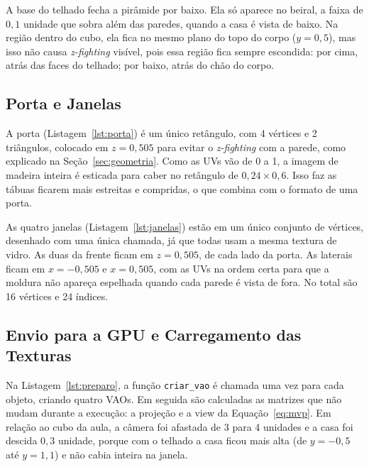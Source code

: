 \documentclass{article}
\begin{document}
A base do telhado fecha a pirâmide por baixo. Ela só aparece no beiral, a faixa de $0{,}1$ unidade que sobra além das paredes, quando a casa é vista de baixo. Na região dentro do cubo, ela fica no mesmo plano do topo do corpo ($y = 0{,}5$), mas isso não causa \textit{z-fighting} visível, pois essa região fica sempre escondida: por cima, atrás das faces do telhado; por baixo, atrás do chão do corpo.



\subsection{Porta e Janelas}

A porta (Listagem~\ref{lst:porta}) é um único retângulo, com 4 vértices e 2 triângulos, colocado em $z = 0{,}505$ para evitar o \textit{z-fighting} com a parede, como explicado na Seção~\ref{sec:geometria}. Como as UVs vão de 0 a 1, a imagem de madeira inteira é esticada para caber no retângulo de $0{,}24 \times 0{,}6$. Isso faz as tábuas ficarem mais estreitas e compridas, o que combina com o formato de uma porta.



As quatro janelas (Listagem~\ref{lst:janelas}) estão em um único conjunto de vértices, desenhado com uma única chamada, já que todas usam a mesma textura de vidro. As duas da frente ficam em $z = 0{,}505$, de cada lado da porta. As laterais ficam em $x = -0{,}505$ e $x = 0{,}505$, com as UVs na ordem certa para que a moldura não apareça espelhada quando cada parede é vista de fora. No total são 16 vértices e 24 índices.



\subsection{Envio para a GPU e Carregamento das Texturas}

Na Listagem~\ref{lst:preparo}, a função \texttt{criar\_vao} é chamada uma vez para cada objeto, criando quatro VAOs. Em seguida são calculadas as matrizes que não mudam durante a execução: a projeção e a view da Equação~\ref{eq:mvp}. Em relação ao cubo da aula, a câmera foi afastada de 3 para 4 unidades e a casa foi descida $0{,}3$ unidade, porque com o telhado a casa ficou mais alta (de $y = -0{,}5$ até $y = 1{,}1$) e não cabia inteira na janela.
\end{document}
